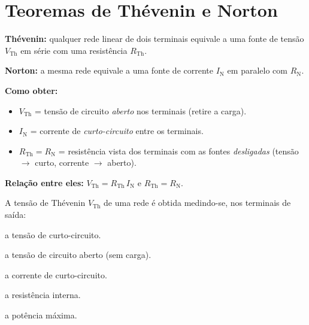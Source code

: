 \section{Teoremas de Thévenin e Norton}

\begin{conceito}
\textbf{Thévenin:} qualquer rede linear de dois terminais equivale a uma fonte de
tensão $V_{\text{Th}}$ em série com uma resistência $R_{\text{Th}}$.\par
\textbf{Norton:} a mesma rede equivale a uma fonte de corrente $I_{\text{N}}$ em
paralelo com $R_{\text{N}}$.\par
\textbf{Como obter:}
\begin{itemize}[leftmargin=1.6em,itemsep=1pt,topsep=2pt]
\item $V_{\text{Th}}$ = tensão de circuito \emph{aberto} nos terminais (retire a
      carga).
\item $I_{\text{N}}$ = corrente de \emph{curto-circuito} entre os terminais.
\item $R_{\text{Th}} = R_{\text{N}}$ = resistência vista dos terminais com as fontes
      \emph{desligadas} (tensão $\to$ curto, corrente $\to$ aberto).
\end{itemize}
\textbf{Relação entre eles:}
$V_{\text{Th}} = R_{\text{Th}}\,I_{\text{N}}$ e
$R_{\text{Th}} = R_{\text{N}}$.
\end{conceito}

\legendaniveis

\blocofixacao

\begin{questao}[1]{}
A tensão de Thévenin $V_{\text{Th}}$ de uma rede é obtida medindo-se, nos
terminais de saída:
\begin{alternativas}
\item a tensão de curto-circuito.
\item a tensão de circuito aberto (sem carga).
\item a corrente de curto-circuito.
\item a resistência interna.
\item a potência máxima.
\end{alternativas}
\end{questao}

